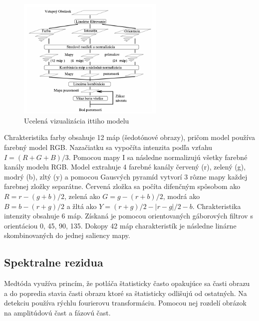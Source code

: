 \begin{figure}[H]
 \centering
 \includegraphics[width=7cm]{pics/itti-1-svk.png}
 \caption{Ucelená vizualizácia ittiho modelu\cite{itty-98}}\label{wrap-fig:1}
\end{figure}
\vspace{10mm}

Chrakteristika farby obsahuje 12 máp (šedotónové obrazy), pričom model používa farebný model RGB.
Nazačiatku sa vypočíta intenzita podľa vzťahu \begin{math} I = (R+G+B)/3\end{math}.
Pomocou mapy I sa následne normalizujú všetky farebné kanály modelu RGB.
Model extrahuje 4 farebné kanály červený (r), zelený (g), modrý (b), zltý (y) a pomocou Gausvých pyramíd vytvorí 3 rôzne mapy každej farebnej zložky separátne.
Červená zložka sa počíta difenčným spôsobom ako \begin{math} R = r - (g + b)/2 \end{math}, zelená ako \begin{math} G = g - (r + b)/2 \end{math}, modrá ako \begin{math}B = b - (r + g)/2\end{math} a žltá ako \begin{math}Y = (r + g)/2 - |r - g|/2 - b\end{math}.
Chrakteristika intenzity obsahuje 6 máp.
Získaná je pomocou orientovaných gáborových filtrov s orientáciou 0\degree, 45\degree, 90\degree, 135\degree.
Dokopy 42 máp charakteristík je následne linárne skombinovaných do jednej saliency mapy\cite{itty-98}.


\subsection{Spektralne rezidua}
Medtóda využíva princím, že potláča štatisticky často opakujúce sa časti obrazu a do popredia stavia časti obrazu ktoré sa štatisticky odlišujú od ostatných.
Na detekciu používa rýchlu fourierovu transformáciu.
Pomocou nej rozdelí obrázok na amplitúdovú čast a fázovú čast.


